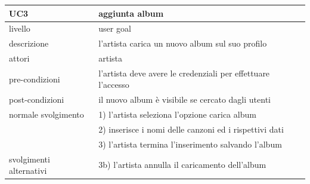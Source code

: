 \documentclass{article}
\begin{document}
\begin{center}
    \begin{tabular}{|l|l|}
      \hline
      \textbf{UC3}            & \textbf{aggiunta album}                                      \\
      \hline
      livello                 & user goal                                                    \\
      \hline
      descrizione             & l'artista carica un nuovo album sul suo profilo              \\
      \hline
      attori                  & artista                                                      \\
      \hline
      pre-condizioni          & l'artista deve avere le credenziali per effettuare l'accesso \\
      \hline
      post-condizioni         & il nuovo album è visibile se cercato dagli utenti            \\
      \hline
      normale svolgimento     & 1) l'artista seleziona l'opzione carica album                \\
      & 2) inserisce i nomi delle canzoni ed i rispettivi dati       \\
      & 3) l'artista termina l'inserimento salvando l'album
      \\
      \hline
      svolgimenti alternativi & 3b) l'artista annulla il caricamento dell'album              \\
      \hline

    \end{tabular}

    \vspace{40pt}


\end{center}
\end{document}

